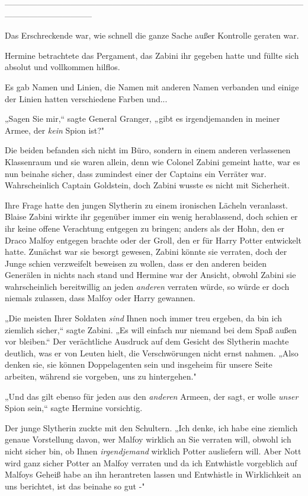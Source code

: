 {--------------------------------------------------------------------------------------------------------------------------------------------

\hfill\break Das Erschreckende war, wie schnell die ganze Sache außer Kontrolle geraten war.

Hermine betrachtete das Pergament, das Zabini ihr gegeben hatte und füllte sich absolut und vollkommen hilflos.

Es gab Namen und Linien, die Namen mit anderen Namen verbanden und einige der Linien hatten verschiedene Farben und...

„Sagen Sie mir,“ sagte General Granger, „gibt es irgendjemanden in meiner Armee, der \emph{kein} Spion ist?"

Die beiden befanden sich nicht im Büro, sondern in einem anderen verlassenen Klassenraum und sie waren allein, denn wie Colonel Zabini gemeint hatte, war es nun beinahe sicher, dass zumindest einer der Captains ein Verräter war. Wahrscheinlich Captain Goldstein, doch Zabini wusste es nicht mit Sicherheit.

Ihre Frage hatte den jungen Slytherin zu einem ironischen Lächeln veranlasst. Blaise Zabini wirkte ihr gegenüber immer ein wenig herablassend, doch schien er ihr keine offene Verachtung entgegen zu bringen; anders als der Hohn, den er Draco Malfoy entgegen brachte oder der Groll, den er für Harry Potter entwickelt hatte. Zunächst war sie besorgt gewesen, Zabini könnte sie verraten, doch der Junge schien verzweifelt beweisen zu wollen, dass er den anderen beiden Generälen in nichts nach stand und Hermine war der Ansicht, obwohl Zabini sie wahrscheinlich bereitwillig an jeden \emph{anderen} verraten würde, so würde er doch niemals zulassen, dass Malfoy oder Harry gewannen.

„Die meisten Ihrer Soldaten \emph{sind} Ihnen noch immer treu ergeben, da bin ich ziemlich sicher,“ sagte Zabini. „Es will einfach nur niemand bei dem Spaß außen vor bleiben.“ Der verächtliche Ausdruck auf dem Gesicht des Slytherin machte deutlich, was er von Leuten hielt, die Verschwörungen nicht ernst nahmen. „Also denken sie, sie können Doppelagenten sein und insgeheim für unsere Seite arbeiten, während sie vorgeben, uns zu hintergehen."

„Und das gilt ebenso für jeden aus den \emph{anderen} Armeen, der sagt, er wolle \emph{unser} Spion sein,“ sagte Hermine vorsichtig.

Der junge Slytherin zuckte mit den Schultern. „Ich denke, ich habe eine ziemlich genaue Vorstellung davon, wer Malfoy wirklich an Sie verraten will, obwohl ich nicht sicher bin, ob Ihnen \emph{irgendjemand} wirklich Potter ausliefern will. Aber Nott wird ganz sicher Potter an Malfoy verraten und da ich Entwhistle vorgeblich auf Malfoys Geheiß habe an ihn herantreten lassen und Entwhistle in Wirklichkeit an uns berichtet, ist das beinahe so gut -"

}
